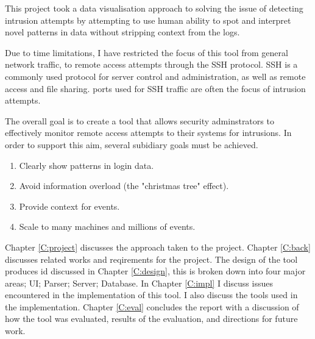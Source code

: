 This project took a data visualisation approach to solving the issue of detecting intrusion attempts by attempting to use human ability to spot and interpret novel patterns in data without stripping context from the logs. 

Due to time limitations, I have restricted the focus of this tool from general network traffic, to remote access attempts through the SSH protocol. SSH is a commonly used protocol for server control and administration, as well as remote access and file sharing. ports used for SSH traffic are often the focus of intrusion attempts.

The overall goal is to create a tool that allows security adminstrators to effectively monitor remote access attempts to their systems for intrusions. 
In order to support this aim, several subidiary goals must be achieved.

\begin{enumerate}
\item{Clearly show patterns in login data.}
\item{Avoid information overload (the "christmas tree" effect).}
\item{Provide context for events.}
\item{Scale to many machines and millions of events.}
\end{enumerate}

Chapter \ref{C:project} discusses the approach taken to the project. Chapter \ref{C:back} discusses related works and reqirements for the project. The design of the tool produces id discussed in Chapter \ref{C:design}, this is broken down into four major areas; UI; Parser; Server; Database. In Chapter \ref{C:impl} I discuss issues encountered in the implementation of this tool. I also discuss the tools used in the implementation. Chapter \ref{C:eval} concludes the report with a discussion of how the tool was evaluated, results of the evaluation, and directions for future work. 
